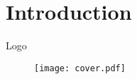 \documentclass[
    ref = refDemo,
]{spBeamer}
\begin{document}
    \section{Introduction}
        \begin{frame}{Logo}
            \begin{figure}
                \centering
                \texttt{[image: cover.pdf]}
            \end{figure}
        \end{frame}
    
\end{document}
